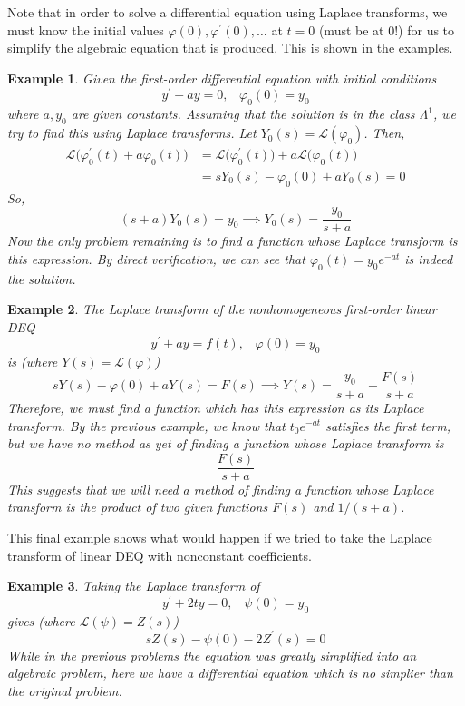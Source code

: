 \documentclass{article}
\newtheorem{example}{Example}[section]
\theoremstyle{remark}
\theoremstyle{definition}
\begin{document}
      Note that in order to solve a differential equation using Laplace transforms, we must know the initial values $\varphi(0), \varphi^\prime (0), \ldots$ at $t = 0$ (must be at $0$!) for us to simplify the algebraic equation that is produced. This is shown in the examples. 

      \begin{example}
      Given the first-order differential equation with initial conditions
      \[y^\prime + a y = 0, \;\;\; \varphi_0 (0) = y_0\]
      where $a, y_0$ are given constants. Assuming that the solution is in the class $\Lambda^1$, we try to find this using Laplace transforms. Let $Y_0 (s) = \mathcal{L}( \varphi_0)$. Then,
      \begin{align*}
          \mathcal{L}\big(\varphi_0^\prime (t) + a \varphi_0 (t)\big) & = \mathcal{L}\big(\varphi_0^\prime (t)\big) + a \mathcal{L}\big(\varphi_0 (t)\big) \\
          & = s Y_0 (s) - \varphi_0 (0) + a Y_0 (s) = 0
      \end{align*}
      So, 
      \[(s+a) Y_0 (s) = y_0 \implies Y_0 (s) = \frac{y_0}{s+a}\]
      Now the only problem remaining is to find a function whose Laplace transform is this expression. By direct verification, we can see that $\varphi_0 (t) = y_0 e^{-at}$ is indeed the solution. 
      \end{example}

      \begin{example}
      The Laplace transform of the nonhomogeneous first-order linear DEQ 
      \[y^\prime + a y= f(t), \;\;\; \varphi(0) = y_0\]
      is (where $Y(s) = \mathcal{L}(\varphi)$)
      \[s Y(s) - \varphi(0) + a Y(s) = F(s) \implies Y(s) = \frac{y_0}{s+a} + \frac{F(s)}{s+a}\]
      Therefore, we must find a function which has this expression as its Laplace transform. By the previous example, we know that $t_0 e^{-at}$ satisfies the first term, but we have no method as yet of finding a function whose Laplace transform is 
      \[\frac{F(s)}{s+a}\]
      This suggests that we will need a method of finding a function whose Laplace transform is the product of two given functions $F(s)$ and $1/(s+a)$. 
      \end{example}

      This final example shows what would happen if we tried to take the Laplace transform of linear DEQ with nonconstant coefficients. 

      \begin{example}
      Taking the Laplace transform of 
      \[y^\prime + 2t y = 0, \;\;\; \psi(0) = y_0\]
      gives (where $\mathcal{L}(\psi) = Z(s)$) 
      \[sZ(s) - \psi(0) - 2Z^\prime (s) = 0\]
      While in the previous problems the equation was greatly simplified into an algebraic problem, here we have a differential equation which is no simplier than the original problem. 
      \end{example}
\end{document}
